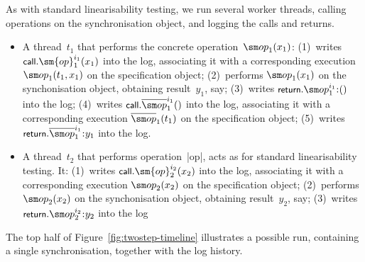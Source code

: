 As with standard linearisability testing, we run several worker threads,
calling operations on the synchronisation object, and logging the calls and
returns.
%
\begin{itemize}
\item A thread~$t_1$ that performs the concrete operation~$\op_1(x_1)$:
  (1)~writes $\call.\sm{op}_1^{i_1}(x_1)$ into the log, associating it with a
  corresponding execution $\op_1(t_1, x_1)$ on the specification object;
  (2)~performs $\op_1(x_1)$ on the synchonisation object, obtaining
  result~$y_1$, say; (3)~writes $\return.\op_1^{i_1} \:: ()$ into the log;
  (4)~writes $\call.\overline{\op}_1^{i_1}()$ into the log, associating it
  with a corresponding execution $\overline{\op}_1(t_1)$ on the specification
  object; (5)~writes $\return.\overline{\op}_1^{i_1} \:: y_1$ into the log.

\item A thread~$t_2$ that performs operation~|op|, acts as for standard
  linearisability testing.  It: (1)~writes $\call.\sm{op}_2^{i_2}(x_2)$ into
  the log, associating it with a corresponding execution $\op_2(x_2)$ on the
  specification object; (2)~performs $\op_2(x_2)$ on the synchonisation
  object, obtaining result~$y_2$, say; (3)~writes $\return.\op_2^{i_2} \::
  y_2$ into the log
\end{itemize}
%
The top half of Figure~\ref{fig:twostep-timeline} illustrates a possible run,
containing a single synchronisation, together with the log history.

